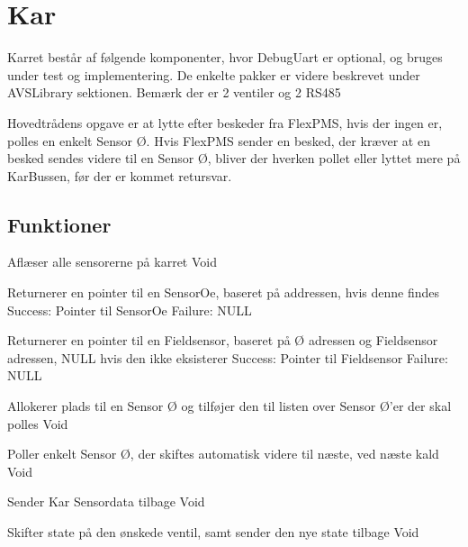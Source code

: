 \section{Kar}

Karret består af følgende komponenter, 
hvor DebugUart er optional, og bruges under 
test og implementering. De enkelte pakker er 
videre beskrevet under AVSLibrary sektionen. 
Bemærk der er 2 ventiler og 2 RS485


Hovedtrådens opgave er at lytte efter beskeder fra FlexPMS, 
hvis der ingen er, polles en enkelt Sensor Ø. Hvis FlexPMS 
sender en besked, der kræver at en besked sendes videre til 
en Sensor Ø, bliver der hverken pollet eller lyttet mere 
på KarBussen, før der er kommet retursvar.


\subsection{Funktioner}

{Aflæser alle sensorerne på karret}
{Void}
{}

{Returnerer en pointer til en SensorOe, baseret på addressen, hvis denne findes}
{Success: Pointer til SensorOe Failure: NULL}
{
}

{Returnerer en pointer til en Fieldsensor, baseret på Ø adressen og Fieldsensor adressen, NULL hvis den ikke eksisterer}
{Success: Pointer til Fieldsensor Failure: NULL}
{
}

{Allokerer plads til en Sensor Ø og tilføjer den til listen over Sensor Ø'er der skal polles}
{Void}
{
}

{Poller enkelt Sensor Ø, der skiftes automatisk videre til næste, ved næste kald}
{Void}
{}

{Sender Kar Sensordata tilbage}
{Void}
{
}

{Skifter state på den ønskede ventil, samt sender den nye state tilbage}
{Void}
{
}

